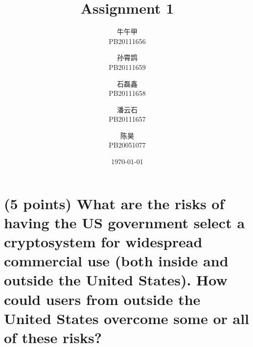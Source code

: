 \documentclass[lang=cn,a4paper,newtx]{elegantpaper}
\title{Assignment 1}
\author{牛午甲 \\ PB20111656 \and 孙霄鹍 \\ PB20111659 \and 石磊鑫 \\ PB20111658 \and 潘云石 \\ PB20111657 \and 陈昊 \\ PB20051077}
\institute{中国科学技术大学}
\date{\today}
\begin{document}
	
	\maketitle

\section{(5 points) What are the risks of having the US government select a cryptosystem for widespread commercial use (both inside and outside the United States). How could users from outside the United States overcome some or all of these risks?}


	
\end{document}
